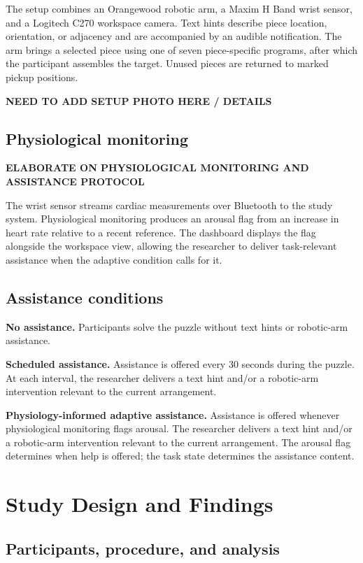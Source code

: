 \documentclass[sigconf]{aamas}
\begin{document}
The setup combines an Orangewood robotic arm, a Maxim H Band wrist sensor, and a Logitech C270 workspace camera. Text hints describe piece location, orientation, or adjacency and are accompanied by an audible notification. The arm brings a selected piece using one of seven piece-specific programs, after which the participant assembles the target. Unused pieces are returned to marked pickup positions.

\textbf{NEED TO ADD SETUP PHOTO HERE / DETAILS}

\subsection{Physiological monitoring}

\textbf{ELABORATE ON PHYSIOLOGICAL MONITORING AND ASSISTANCE PROTOCOL}

The wrist sensor streams cardiac measurements over Bluetooth to the study system. Physiological monitoring produces an arousal flag from an increase in heart rate relative to a recent reference. The dashboard displays the flag alongside the workspace view, allowing the researcher to deliver task-relevant assistance when the adaptive condition calls for it.

\subsection{Assistance conditions}

\textbf{No assistance.} Participants solve the puzzle without text hints or robotic-arm assistance.

\textbf{Scheduled assistance.} Assistance is offered every 30 seconds during the puzzle. At each interval, the researcher delivers a text hint and/or a robotic-arm intervention relevant to the current arrangement.

\textbf{Physiology-informed adaptive assistance.} Assistance is offered whenever physiological monitoring flags arousal. The researcher delivers a text hint and/or a robotic-arm intervention relevant to the current arrangement. The arousal flag determines when help is offered; the task state determines the assistance content.

\section{Study Design and Findings}

\subsection{Participants, procedure, and analysis}
\end{document}
